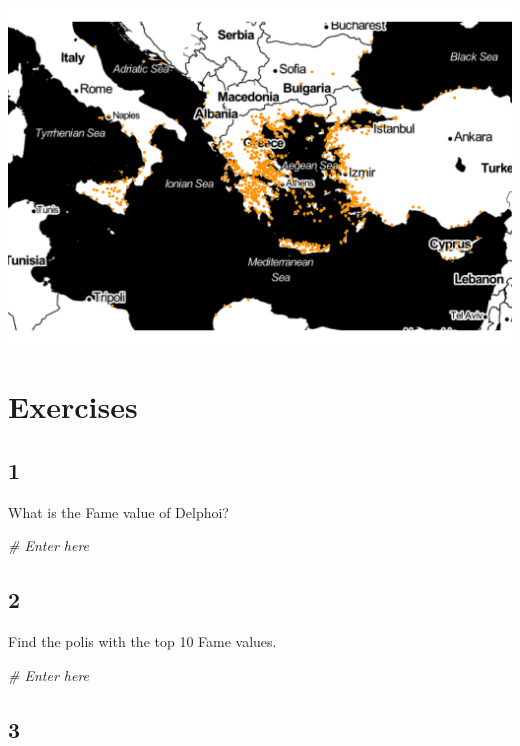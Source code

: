\documentclass[]{book}
\newenvironment{Shaded}{\begin{snugshade}}{\end{snugshade}}
\newcommand{\CommentTok}[1]{\textcolor[rgb]{0.56,0.35,0.01}{\textit{#1}}}
\theoremstyle{definition}
\theoremstyle{definition}
\theoremstyle{definition}
\theoremstyle{remark}
\begin{document}
\includegraphics{images/ober_ggmap_polis.png}

\hypertarget{exercises}{%
\section*{Exercises}\label{exercises}}

\hypertarget{section}{%
\subsection*{1}\label{section}}

What is the Fame value of Delphoi?

\begin{Shaded}
\begin{Highlighting}[]
\CommentTok{# Enter here}
\end{Highlighting}
\end{Shaded}

\hypertarget{section-1}{%
\subsection*{2}\label{section-1}}

Find the polis with the top 10 Fame values.

\begin{Shaded}
\begin{Highlighting}[]
\CommentTok{# Enter here}
\end{Highlighting}
\end{Shaded}

\hypertarget{section-2}{%
\subsection*{3}\label{section-2}}
\end{document}
